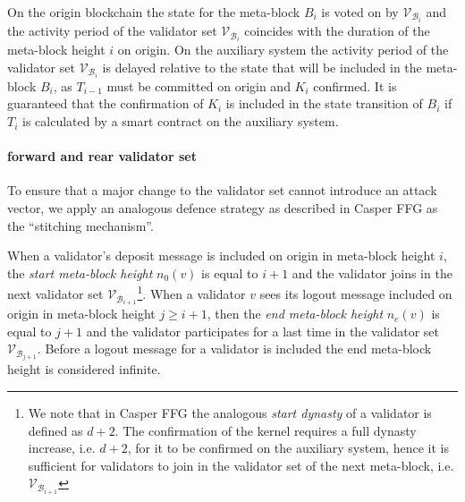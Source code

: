 \documentclass[12pt,a4paper]{article}
\begin{document}
On the origin blockchain the state for the meta-block $B_i$ is voted on by $\mathcal{V}_{\mathcal{B}_i}$ and the activity period of the validator set $\mathcal{V}_{\mathcal{B}_i}$ coincides with the duration of the meta-block height $i$ on origin.
On the auxiliary system the activity period of the validator set $\mathcal{V}_{\mathcal{B}_i}$ is delayed relative to the state that will be included in the meta-block $B_i$, as $T_{i-1}$ must be committed on origin and $K_i$ confirmed.
It is guaranteed that the confirmation of $K_i$ is included in the state transition of $B_i$ if $T_i$ is calculated by a smart contract on the auxiliary system.

\paragraph{forward and rear validator set} To ensure that a major change to the validator set cannot introduce an attack vector, we apply an analogous defence strategy as described in Casper FFG\cite{casperffg} as the ``stitching mechanism''.

When a validator's deposit message is included on origin in meta-block height $i$, the \emph{start meta-block height} $n_0(v)$ is equal to $i+1$ and the validator joins in the next validator set $\mathcal{V}_{\mathcal{B}_{i+1}}$\footnote{
  We note that in Casper FFG\cite{casperffg} the analogous \emph{start dynasty} of a validator is defined as $d+2$.
  The confirmation of the kernel requires a full dynasty increase, i.e. $d+2$, for it to be confirmed on the auxiliary system, hence it is sufficient for validators to join in the validator set of the next meta-block, i.e. $\mathcal{V}_{\mathcal{B}_{i+1}}$}.
When a validator $v$ sees its logout message included on origin in meta-block height $j \geq i + 1$, then the \emph{end meta-block height} $n_e(v)$ is equal to $j + 1$ and the validator participates for a last time in the validator set $\mathcal{V}_{\mathcal{B}_{j+1}}$. Before a logout message for a validator is included the end meta-block height is considered infinite.
\end{document}
